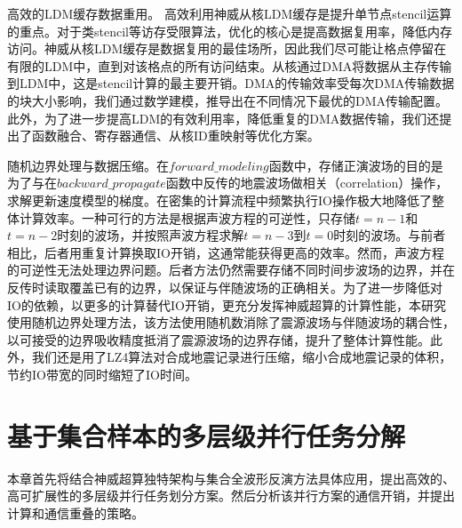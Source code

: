\documentclass[degree=doctor]{thuthesis}
\begin{document}
高效的LDM缓存数据重用。 高效利用神威从核LDM缓存是提升单节点stencil运算的重点。对于类stencil等访存受限算法，优化的核心是提高数据复用率，降低内存访问。神威从核LDM缓存是数据复用的最佳场所，因此我们尽可能让格点停留在有限的LDM中，直到对该格点的所有访问结束。从核通过DMA将数据从主存传输到LDM中，这是stencil计算的最主要开销。DMA的传输效率受每次DMA传输数据的块大小影响，我们通过数学建模，推导出在不同情况下最优的DMA传输配置。此外，为了进一步提高LDM的有效利用率，降低重复的DMA数据传输，我们还提出了函数融合、寄存器通信、从核ID重映射等优化方案。

随机边界处理与数据压缩。在$forward\_modeling$函数中，存储正演波场的目的是为了与在$backward\_propagate$函数中反传的地震波场做相关（correlation）操作，求解更新速度模型的梯度。在密集的计算流程中频繁执行IO操作极大地降低了整体计算效率。一种可行的方法是根据声波方程的可逆性，只存储$t=n-1$和$t=n-2$时刻的波场，并按照声波方程求解$t=n-3$到$t=0$时刻的波场。与前者相比，后者用重复计算换取IO开销，这通常能获得更高的效率。然而，声波方程的可逆性无法处理边界问题。后者方法仍然需要存储不同时间步波场的边界，并在反传时读取覆盖已有的边界，以保证与伴随波场的正确相关。为了进一步降低对IO的依赖，以更多的计算替代IO开销，更充分发挥神威超算的计算性能，本研究使用随机边界处理方法，该方法使用随机数消除了震源波场与伴随波场的耦合性，以可接受的边界吸收精度抵消了震源波场的边界存储，提升了整体计算性能。此外，我们还是用了LZ4算法对合成地震记录进行压缩，缩小合成地震记录的体积，节约IO带宽的同时缩短了IO时间。

\section{基于集合样本的多层级并行任务分解} %
\label{sec:基于集合样本的多层级并行任务分解}

本章首先将结合神威超算独特架构与集合全波形反演方法具体应用，提出高效的、高可扩展性的多层级并行任务划分方案。然后分析该并行方案的通信开销，并提出计算和通信重叠的策略。
\end{document}
